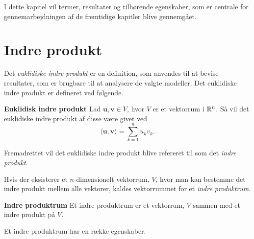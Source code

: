 I dette kapitel vil termer, resultater og tilhørende egenskaber, som er centrale for gennemarbejdningen af de fremtidige kapitler blive gennemgået.

\section{Indre produkt}
Det \textit{euklidiske indre produkt} er en definition, som anvendes til at bevise resultater, som er brugbare til at analysere de valgte modeller.
Det euklidiske indre produkt er defineret ved følgende.
%
\begin{defn}\textbf{Euklidisk indre produkt}\label{indre_produkt_Eurlidisk}
\newline
    Lad $\textbf{u}, \textbf{v} \in V$, hvor $V$ er et vektorrum i $\mathbb{R}^n$. Så vil det euklidiske indre produkt af disse være givet ved
    \begin{equation*}
     {\langle \textbf{u},\textbf{v}\rangle} = \sum_{k=1}^{n}\textbf{$u_k$}\textbf{$v_k$}.
    \end{equation*}
\end{defn}

Fremadrettet vil det euklidiske indre produkt blive refereret til som det \textit{indre produkt}.

Hvis der eksisterer et $n$-dimensionelt vektorrum, $V$, hvor man kan bestemme det indre produkt mellem alle vektorer, kaldes vektorrummet for et \textit{indre produktrum}.
%
\begin{defn}\textbf{Indre produktrum}\label{indre_produktrum}
\newline
    Et indre produktrum er et vektorrum, $V$ sammen med et indre produkt på $V$. 
\end{defn}
%
Et indre produktrum har en række egenskaber.\\

